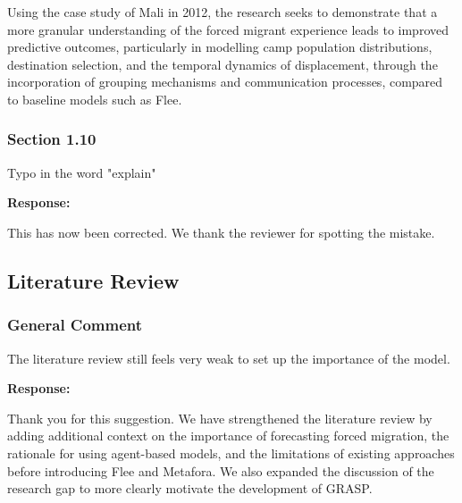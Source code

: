 \documentclass[11pt,a4paper]{article}
\begin{document}
\vspace{0.5cm}

\begin{updatebox}
Using the case study of Mali in 2012, the research seeks to demonstrate that a more granular understanding of the forced migrant experience leads to improved predictive outcomes, particularly in modelling camp population distributions, destination selection, and the temporal dynamics of displacement, through the incorporation of grouping mechanisms and communication processes, compared to baseline models such as Flee.
\end{updatebox}

\vspace{0.5cm}

\subsubsection*{Section 1.10}

\begin{reviewbox}
Typo in the word "explain"
\end{reviewbox}

\textbf{Response:}

This has now been corrected. We thank the reviewer for spotting the mistake.

\vspace{0.5cm}

\subsection*{Literature Review}

\subsubsection*{General Comment}

\begin{reviewbox}
The literature review still feels very weak to set up the importance of the model.
\end{reviewbox}

\textbf{Response:}

Thank you for this suggestion. We have strengthened the literature review by adding additional context on the importance of forecasting forced migration, the rationale for using agent-based models, and the limitations of existing approaches before introducing Flee and Metafora. We also expanded the discussion of the research gap to more clearly motivate the development of GRASP.
\end{document}
